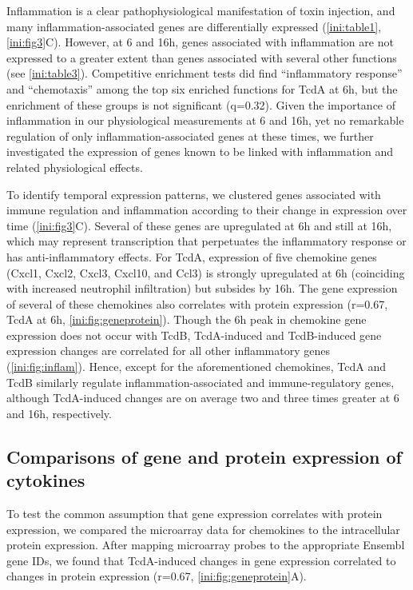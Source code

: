 Inflammation is a clear pathophysiological manifestation of toxin 
injection, and many inflammation-associated genes are differentially 
expressed (\autoref{ini:table1}, \autoref{ini:fig3}C). However, at 
6 and 16h, genes associated with inflammation are not expressed to 
a greater extent than genes associated with several other 
functions (see \autoref{ini:table3}). Competitive enrichment 
tests did find ``inflammatory response'' and ``chemotaxis'' among the top 
six enriched functions for TcdA at 6h, but the enrichment of these 
groups is not significant (q=0.32). Given the importance of 
inflammation in our physiological measurements at 6 and 16h, yet no 
remarkable regulation of only inflammation-associated genes at 
these times, we further investigated the expression of genes known 
to be linked with inflammation and related physiological effects.

To identify temporal expression patterns, we clustered genes 
associated with immune regulation and inflammation according to 
their change in expression over time (\autoref{ini:fig3}C). 
Several of these genes are upregulated at 6h and still at 16h, which 
may represent transcription that perpetuates the inflammatory response 
or has anti-inflammatory effects. For TcdA, expression of five 
chemokine genes (Cxcl1, Cxcl2, Cxcl3, Cxcl10, and Ccl3) is strongly 
upregulated at 6h (coinciding with increased neutrophil infiltration) 
but subsides by 16h. The gene expression of several of these chemokines 
also correlates with protein expression (r=0.67, TcdA at 6h, 
\autoref{ini:fig:geneprotein}). Though the 6h peak in chemokine 
gene expression does not occur with TcdB, TcdA-induced and TcdB-induced 
gene expression changes are correlated for all other inflammatory genes 
(\autoref{ini:fig:inflam}). Hence, except for the aforementioned 
chemokines, TcdA and TcdB similarly regulate inflammation-associated 
and immune-regulatory genes, although TcdA-induced changes are on average 
two and three times greater at 6 and 16h, respectively.




\subsection{Comparisons of gene and protein expression of cytokines}

To test the common assumption that gene expression correlates
with protein expression, we compared the microarray data for chemokines to the
intracellular protein expression. After mapping
microarray probes to the appropriate Ensembl gene IDs, we found that TcdA-induced 
changes in gene expression correlated to changes in protein 
expression (r=0.67, \autoref{ini:fig:geneprotein}A). 

